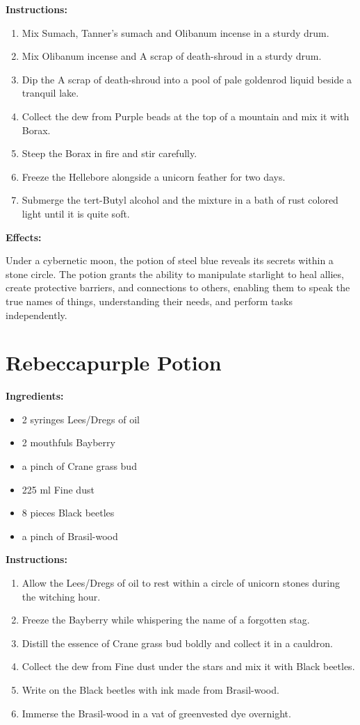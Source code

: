\documentclass{article}
\begin{document}
\textbf{Instructions:}

\begin{enumerate}
  \item Mix Sumach, Tanner's sumach and Olibanum incense in a sturdy drum.
  \item Mix Olibanum incense and A scrap of death-shroud in a sturdy drum.
  \item Dip the A scrap of death-shroud into a pool of pale goldenrod liquid beside a tranquil lake.
  \item Collect the dew from Purple beads at the top of a mountain and mix it with Borax.
  \item Steep the Borax in fire and stir carefully.
  \item Freeze the Hellebore alongside a unicorn feather for two days.
  \item Submerge the tert-Butyl alcohol and the mixture in a bath of rust colored light until it is quite soft.
\end{enumerate}

\textbf{Effects:}

Under a cybernetic moon, the potion of steel blue reveals its secrets within a stone circle. The potion grants the ability to manipulate starlight to heal allies, create protective barriers, and connections to others, enabling them to speak the true names of things, understanding their needs, and perform tasks independently.

\newpage
\section*{Rebeccapurple Potion}

\textbf{Ingredients:}

\begin{itemize}
  \item 2 syringes Lees/Dregs of oil
  \item 2 mouthfuls Bayberry
  \item a pinch of Crane grass bud
  \item 225 ml Fine dust
  \item 8 pieces Black beetles
  \item a pinch of Brasil-wood
\end{itemize}

\textbf{Instructions:}

\begin{enumerate}
  \item Allow the Lees/Dregs of oil to rest within a circle of unicorn stones during the witching hour.
  \item Freeze the Bayberry while whispering the name of a forgotten stag.
  \item Distill the essence of Crane grass bud boldly and collect it in a cauldron.
  \item Collect the dew from Fine dust under the stars and mix it with Black beetles.
  \item Write on the Black beetles with ink made from Brasil-wood.
  \item Immerse the Brasil-wood in a vat of greenvested dye overnight.
\end{enumerate}
\end{document}
